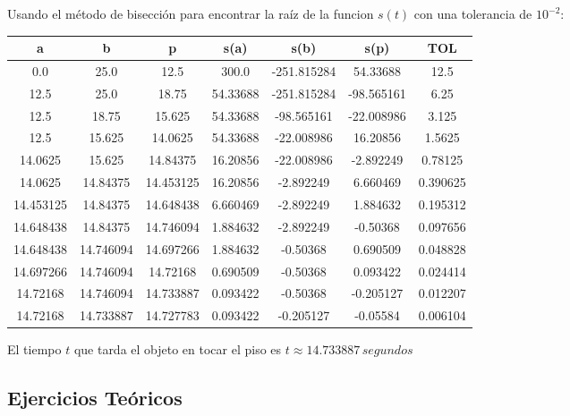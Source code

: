 \documentclass[12pt]{article}
\begin{document}
\begin{enumerate}
    Usando el método de bisección para encontrar la raíz de la funcion \(s(t)\) con una tolerancia de \(10^{-2}\):
    \begin{center}
        \begin{tabular}{|c|c|c|c|c|c|c|}
        \hline
        \textbf{a} & \textbf{b} & \textbf{p} & \textbf{s(a)}&\textbf{s(b)}&\textbf{s(p)} &  \textbf{TOL} \\ \hline
        0.0 & 25.0 & 12.5 & 300.0 & -251.815284 & 54.33688 & 12.5 \\
        12.5 & 25.0 & 18.75 & 54.33688 & -251.815284 & -98.565161 & 6.25 \\
        12.5 & 18.75 & 15.625 & 54.33688 & -98.565161 & -22.008986 & 3.125 \\
        12.5 & 15.625 & 14.0625 & 54.33688 & -22.008986 & 16.20856 & 1.5625 \\
        14.0625 & 15.625 & 14.84375 & 16.20856 & -22.008986 & -2.892249 & 0.78125 \\
        14.0625 & 14.84375 & 14.453125 & 16.20856 & -2.892249 & 6.660469 & 0.390625 \\
        14.453125 & 14.84375 & 14.648438 & 6.660469 & -2.892249 & 1.884632 & 0.195312 \\
        14.648438 & 14.84375 & 14.746094 & 1.884632 & -2.892249 & -0.50368 & 0.097656 \\
        14.648438 & 14.746094 & 14.697266 & 1.884632 & -0.50368 & 0.690509 & 0.048828 \\
        14.697266 & 14.746094 & 14.72168 & 0.690509 & -0.50368 & 0.093422 & 0.024414 \\
        14.72168 & 14.746094 & 14.733887 & 0.093422 & -0.50368 & -0.205127 & 0.012207 \\
        14.72168 & 14.733887 & 14.727783 & 0.093422 & -0.205127 & -0.05584 & 0.006104 \\
        \hline
        \end{tabular}
    \end{center}

    El tiempo \(t\) que tarda el objeto en tocar el piso es \(t \approx 14.733887 \, segundos\) 
\end{enumerate}

\subsection*{Ejercicios Teóricos}
\end{document}
